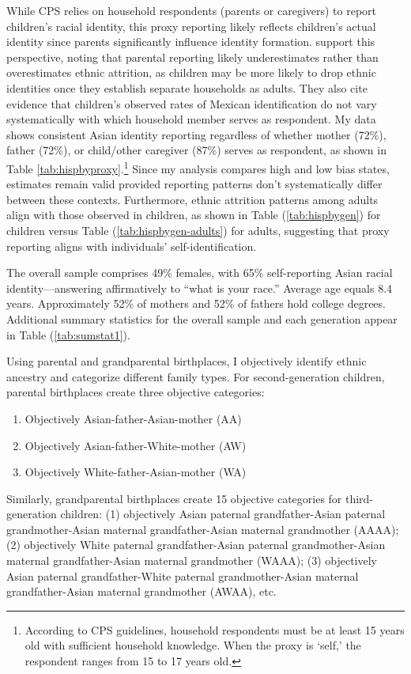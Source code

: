 While CPS relies on household respondents (parents or caregivers) to report children's racial identity, this proxy reporting likely reflects children's actual identity since parents significantly influence identity formation. \textcite{antmanEthnicAttritionAssimilation2020} support this perspective, noting that parental reporting likely underestimates rather than overestimates ethnic attrition, as children may be more likely to drop ethnic identities once they establish separate households as adults. They also cite evidence that children's observed rates of Mexican identification do not vary systematically with which household member serves as respondent. My data shows consistent Asian identity reporting regardless of whether mother (72\%), father (72\%), or child/other caregiver (87\%) serves as respondent, as shown in Table \ref{tab:hispbyproxy}.\footnote{According to CPS guidelines, household respondents must be at least 15 years old with sufficient household knowledge. When the proxy is `self,' the respondent ranges from 15 to 17 years old.} Since my analysis compares high and low bias states, estimates remain valid provided reporting patterns don't systematically differ between these contexts. Furthermore, ethnic attrition patterns among adults align with those observed in children, as shown in Table (\ref{tab:hispbygen}) for children versus Table (\ref{tab:hispbygen-adults}) for adults, suggesting that proxy reporting aligns with individuals' self-identification. 

The overall sample comprises 49\% females, with 65\% self-reporting Asian racial identity—answering affirmatively to ``what is your race.'' Average age equals 8.4 years. Approximately 52\% of mothers and 52\% of fathers hold college degrees. Additional summary statistics for the overall sample and each generation appear in Table (\ref{tab:sumstat1}).

Using parental and grandparental birthplaces, I objectively identify ethnic ancestry and categorize different family types. For second-generation children, parental birthplaces create three objective categories:
\begin{enumerate}
\item Objectively Asian-father-Asian-mother (AA)
\item Objectively Asian-father-White-mother (AW)  
\item Objectively White-father-Asian-mother (WA)
\end{enumerate}

Similarly, grandparental birthplaces create 15 objective categories for third-generation children: (1) objectively Asian paternal grandfather-Asian paternal grandmother-Asian maternal grandfather-Asian maternal grandmother (AAAA); (2) objectively White paternal grandfather-Asian paternal grandmother-Asian maternal grandfather-Asian maternal grandmother (WAAA); (3) objectively Asian paternal grandfather-White paternal grandmother-Asian maternal grandfather-Asian maternal grandmother (AWAA), etc.

